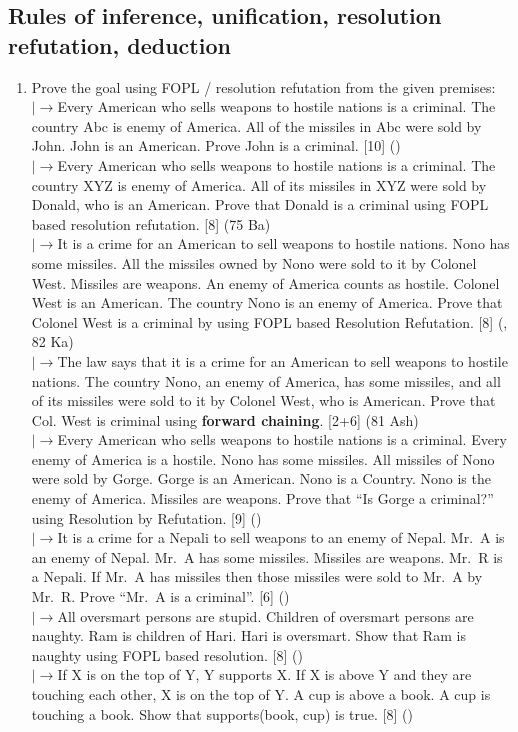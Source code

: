 \documentclass[12pt]{article}
\newcommand{\lb}{\\$\left|\rightarrow\right.$}
\begin{document}
  \subsection{Rules of inference, unification, resolution refutation, deduction}
    \begin{enumerate}[topsep=0pt, noitemsep]
      \item Prove the goal using FOPL / resolution refutation from the given premises:
        \lb Every American who sells weapons to hostile nations is a criminal. The country Abc is enemy of America. All of the missiles in Abc were sold by John. John is an American. Prove John is a criminal. \hfill [10] ()
        \lb Every American who sells weapons to hostile nations is a criminal. The country XYZ is enemy of America. All of its missiles in XYZ were sold by Donald, who is an American. Prove that Donald is a criminal using FOPL based resolution refutation. \hfill [8] (75 Ba)
        \lb It is a crime for an American to sell weapons to hostile nations. Nono has some missiles. All the missiles owned by Nono were sold to it by Colonel West. Missiles are weapons. An enemy of America counts as hostile. Colonel West is an American. The country Nono is an enemy of America. Prove that Colonel West is a criminal by using FOPL based Resolution Refutation. \hfill [8] (, 82 Ka)
        \lb The law says that it is a crime for an American to sell weapons to hostile nations. The country Nono, an enemy of America, has some missiles, and all of its missiles were sold to it by Colonel West, who is American. Prove that Col. West is criminal using \textbf{forward chaining}. \hfill [2+6] (81 Ash)
        \lb Every American who sells weapons to hostile nations is a criminal. Every enemy of America is a hostile. Nono has some missiles. All missiles of Nono were sold by Gorge. Gorge is an American. Nono is a Country. Nono is the enemy of America. Missiles are weapons. Prove that ``Is Gorge a criminal?'' using Resolution by Refutation. \hfill [9] ()
        \lb It is a crime for a Nepali to sell weapons to an enemy of Nepal. Mr.\ A is an enemy of Nepal. Mr.\ A has some missiles. Missiles are weapons. Mr.\ R is a Nepali. If Mr.\ A has missiles then those missiles were sold to Mr.\ A by Mr.\ R. Prove ``Mr.\ A is a criminal''. \hfill [6] ()
        \lb All oversmart persons are stupid. Children of oversmart persons are naughty. Ram is children of Hari. Hari is oversmart. Show that Ram is naughty using FOPL based resolution. \hfill [8] ()
        \lb If X is on the top of Y, Y supports X. If X is above Y and they are touching each other, X is on the top of Y. A cup is above a book. A cup is touching a book. Show that supports(book, cup) is true. \hfill [8] ()

\end{enumerate}
\end{document}
